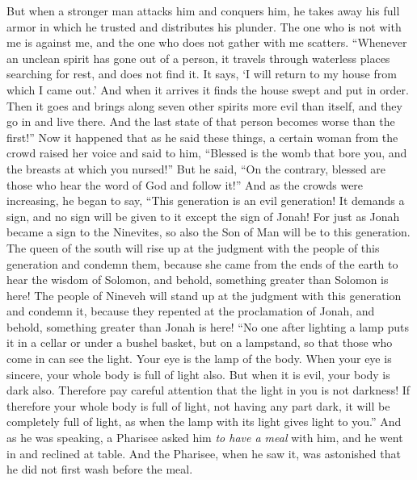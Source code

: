\begin{biblechapter}
\verse But when a stronger man attacks him and conquers him, he takes away his full armor in which he trusted and distributes his plunder.
\verse The one who is not with me is against me, and the one who does not gather with me scatters.
 “Whenever an unclean spirit has gone out of a person, it travels through waterless places searching for rest, and does not find it. It says, ‘I will return to my house from which I came out.’
\verse And when it arrives it finds the house swept and put in order.
\verse Then it goes and brings along seven other spirits more evil than itself, and they go in and live there. And the last state of that person becomes worse than the first!”
\verse Now it happened that as he said these things, a certain woman from the crowd raised her voice and said to him, “Blessed is the womb that bore you, and the breasts at which you nursed!”
\verse But he said, “On the contrary, blessed are those who hear the word of God and follow it!”
 And as the crowds were increasing, he began to say, “This generation is an evil generation! It demands a sign, and no sign will be given to it except the sign of Jonah!
\verse For just as Jonah became a sign to the Ninevites, so also the Son of Man will be to this generation.
\verse The queen of the south will rise up at the judgment with the people of this generation and condemn them, because she came from the ends of the earth to hear the wisdom of Solomon, and behold, something greater than Solomon is here!
\verse The people of Nineveh will stand up at the judgment with this generation and condemn it, because they repented at the proclamation of Jonah, and behold, something greater than Jonah is here!
 “No one after lighting a lamp puts it in a cellar or under a bushel basket, but on a lampstand, so that those who come in can see the light.
\verse Your eye is the lamp of the body. When your eye is sincere, your whole body is full of light also. But when it is evil, your body is dark also.
\verse Therefore pay careful attention that the light in you is not darkness!
\verse If therefore your whole body is full of light, not having any part dark, it will be completely full of light, as when the lamp with its light gives light to you.”
 And as he was speaking, a Pharisee asked him \textit{to have a meal} with him, and he went in and reclined at table.
\verse And the Pharisee, when he saw it, was astonished that he did not first wash before the meal.

\end{biblechapter}
